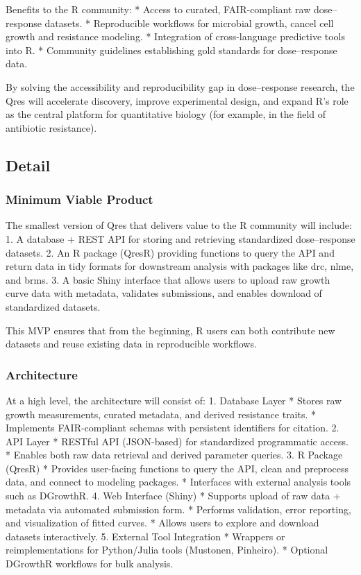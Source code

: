 \documentclass[
]{article}
\begin{document}
Benefits to the R community: * Access to curated, FAIR-compliant raw
dose--response datasets. * Reproducible workflows for microbial growth,
cancel cell growth and resistance modeling. * Integration of
cross-language predictive tools into R. * Community guidelines
establishing gold standards for dose--response data.

By solving the accessibility and reproducibility gap in dose--response
research, the Qres will accelerate discovery, improve experimental
design, and expand R's role as the central platform for quantitative
biology (for example, in the field of antibiotic resistance).

\subsection{Detail}\label{detail}

\subsubsection{Minimum Viable Product}\label{minimum-viable-product}

The smallest version of Qres that delivers value to the R community will
include: 1. A database + REST API for storing and retrieving
standardized dose--response datasets. 2. An R package (QresR) providing
functions to query the API and return data in tidy formats for
downstream analysis with packages like drc, nlme, and brms. 3. A basic
Shiny interface that allows users to upload raw growth curve data with
metadata, validates submissions, and enables download of standardized
datasets.

This MVP ensures that from the beginning, R users can both contribute
new datasets and reuse existing data in reproducible workflows.

\subsubsection{Architecture}\label{architecture}

At a high level, the architecture will consist of: 1. Database Layer *
Stores raw growth measurements, curated metadata, and derived resistance
traits. * Implements FAIR-compliant schemas with persistent identifiers
for citation. 2. API Layer * RESTful API (JSON-based) for standardized
programmatic access. * Enables both raw data retrieval and derived
parameter queries. 3. R Package (QresR) * Provides user-facing functions
to query the API, clean and preprocess data, and connect to modeling
packages. * Interfaces with external analysis tools such as DGrowthR. 4.
Web Interface (Shiny) * Supports upload of raw data + metadata via
automated submission form. * Performs validation, error reporting, and
visualization of fitted curves. * Allows users to explore and download
datasets interactively. 5. External Tool Integration * Wrappers or
reimplementations for Python/Julia tools (Mustonen, Pinheiro). *
Optional DGrowthR workflows for bulk analysis.
\end{document}
